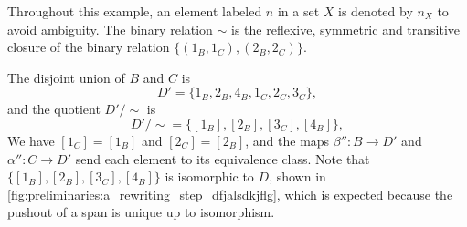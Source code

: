 \begin{example}
\begin{figure}[H]
{
      }
      \caption{}
      \label{fig:preliminaries:a_rewriting_step_dfjalsdkjflg}
  \end{figure}
    Throughout this example, an element labeled \(n\) in a set \(X\) is denoted by \(n_X\) to avoid ambiguity.        
    The binary relation \(\sim\) is the reflexive, symmetric and transitive closure of the binary relation $\{(1_B,1_C),(2_B,2_C)\}$.
 
    The disjoint union of \(B\) and \(C\) is
    \[ 
    D' = \{1_B,2_B,4_B,1_C,2_C,3_C\},
    \]
    and the quotient \(D'/\sim\) is
    \[
    D'/\sim = \{[1_B],[2_B],[3_C],[4_B]\},
    \]
    We have \([1_C]=[1_B]\) and \([2_C]=[2_B]\), and the maps
    \(\beta'' \colon B\to D'\) and \(\alpha'' \colon C\to D'\) send each element to its equivalence class. Note that \(\{[1_B],[2_B],[3_C],[4_B]\}\) is isomorphic to \(D\), shown in \autoref{fig:preliminaries:a_rewriting_step_dfjalsdkjflg}, which is expected because the pushout of a span is unique up to isomorphism.
\end{example}

